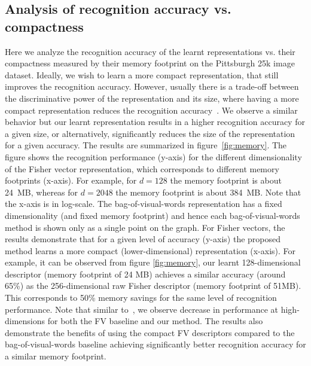   \subsection{Analysis of recognition accuracy vs. compactness}
  \label{sec:memory_results}
  Here we analyze the recognition accuracy of the learnt representations vs. their compactness measured by their memory footprint on the Pittsburgh 25k image dataset.
  Ideally, we wish to learn a more compact representation, that still improves the recognition accuracy. However, usually there is a trade-off between the discriminative power of the representation and its size, where having a more compact representation reduces the recognition accuracy~\cite{Jegou12}. We observe a similar behavior but our learnt representation results in a higher recognition accuracy for a given size, or alternatively, significantly reduces the size of the representation for a given accuracy.   
   The results are summarized in figure~\ref{fig:memory}.
     The figure shows the recognition performance (y-axis) for the different dimensionality of the Fisher vector representation, which corresponds to different memory footprints (x-axis). For example, for $d=128$ the memory footprint is about 24~MB, whereas for $d=2048$ the memory footprint is about 384~MB. Note that the x-axis is in log-scale. The bag-of-visual-words representation has a fixed dimensionality (and fixed memory footprint) and hence each bag-of-visual-words method is shown only as a single point on the graph.  For Fisher vectors, the results demonstrate that for a given level of accuracy (y-axis) the proposed method learns a more compact (lower-dimensional) representation (x-axis). For example, \textcolor{petr}{it can be observed from figure \ref{fig:memory}}, our learnt 128-dimensional descriptor (memory footprint of 24 MB) achieves a similar accuracy (around 65\%) as the 256-dimensional raw Fisher descriptor (memory footprint of 51MB). This corresponds to 50\% memory savings for the same level of recognition performance. Note that similar to~\cite{Jegou12}, we observe decrease in performance at high-dimensions for both the FV baseline and our method. The results also demonstrate the benefits of using the compact FV descriptors compared to the bag-of-visual-words baseline achieving significantly better recognition accuracy for a similar memory footprint.
    

